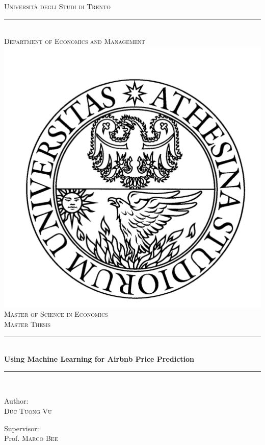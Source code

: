 \documentclass[a4paper,12pt,twoside]{report}
\begin{document}
\begin{onehalfspace}

	\fancyhf{} %
	\rhead{\thepage}
	\lhead{\nouppercase{\leftmark}} %

\begin{titlepage}
\begin{center}

\textsc{\huge Università degli Studi di Trento}\\[-0.375cm] %
\rule{0.85\linewidth}{0.125mm}\\[0.25cm]
\textsc{\Large Department of Economics and Management}\\[1.25cm] %
\includegraphics[width=0.3\linewidth]{logo_unitn.png}\\[1.25cm] %
\textsc{\LARGE Master of Science in Economics}\\[2cm] %
\textsc{\LARGE Master Thesis}\\[0.5cm] %

\rule{\linewidth}{0.5mm}\\[0.75cm] %
{\Large \textbf{Using Machine Learning for Airbnb Price Prediction}}\\[0.5cm] %
\rule{\linewidth}{0.5mm}\\[1cm] %

\begin{minipage}{0.4\textwidth}
\begin{flushleft} \large
Author:\\
\textsc{Duc Tuong Vu} %
\end{flushleft}
\end{minipage}
\begin{minipage}{0.4\textwidth}
\begin{flushright} \large
Supervisor:\\
Prof. \textsc{Marco Bee} %
\end{flushright}
\end{minipage}\\[3cm]


\end{center}
\end{titlepage}
\end{onehalfspace}
\end{document}
